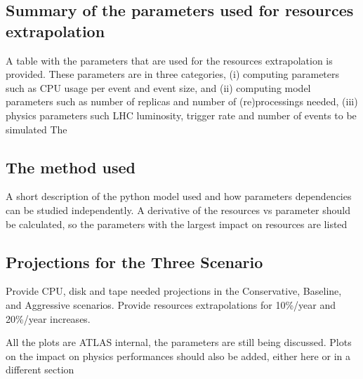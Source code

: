 
\subsection{Summary of the parameters used for resources extrapolation}
A table with the parameters that are used for the resources extrapolation is provided. These parameters are in three categories,  (i) computing parameters such as CPU usage per event and event size, and (ii) computing model parameters such as number of replicas and number of (re)processings needed, (iii) physics parameters such LHC luminosity, trigger rate and number of events to be simulated 
The 
\subsection{The method used}
A short description of the python model used and how parameters dependencies can be studied independently. A derivative of the resources vs parameter should be  calculated, so the parameters with the largest impact on resources are listed


\subsection{Projections for the Three Scenario}
Provide CPU, disk and tape needed projections in the Conservative, Baseline, and Aggressive scenarios. Provide resources extrapolations for 10\%/year and 20\%/year increases.

All the plots are ATLAS internal,  the parameters are still being discussed.    
Plots on the impact on physics performances should also be added, either here or in a different section





